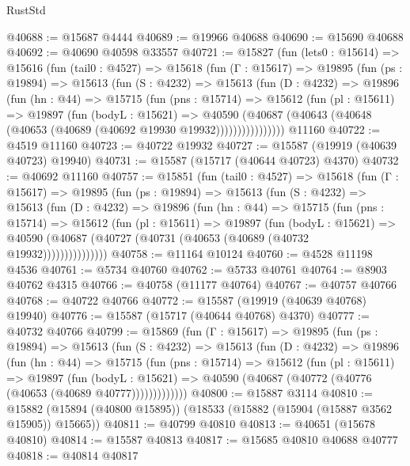 \begin{lexlean}{RustStd}
\begin{coremodule}
@40688 := @15687 @4444
@40689 := @19966 @40688
@40690 := @15690 @40688
@40692 := @40690 @40598 @33557
@40721 := @15827
    (fun (lets0 : @15614) =>
    @15616
      (fun (tail0 : @4527) =>
      @15618
        (fun (Γ : @15617) =>
        @19895
          (fun (ps : @19894) =>
          @15613
            (fun (S : @4232) =>
            @15613
              (fun (D : @4232) =>
              @19896
                (fun (hn : @44) =>
                @15715
                  (fun (pns : @15714) =>
                  @15612
                    (fun (pl : @15611) =>
                    @19897
                      (fun (bodyL : @15621) =>
                      @40590
                        (@40687
                          (@40643 (@40648 (@40653 (@40689 (@40692 @19930 @19932))))))))))))))))
    @11160
@40722 := @4519 @11160
@40723 := @40722 @19932
@40727 := @15587 (@19919 (@40639 @40723) @19940)
@40731 := @15587 (@15717 (@40644 @40723) @4370)
@40732 := @40692 @11160
@40757 := @15851
    (fun (tail0 : @4527) =>
    @15618
      (fun (Γ : @15617) =>
      @19895
        (fun (ps : @19894) =>
        @15613
          (fun (S : @4232) =>
          @15613
            (fun (D : @4232) =>
            @19896
              (fun (hn : @44) =>
              @15715
                (fun (pns : @15714) =>
                @15612
                  (fun (pl : @15611) =>
                  @19897
                    (fun (bodyL : @15621) =>
                    @40590 (@40687 (@40727 (@40731 (@40653 (@40689 (@40732 @19932)))))))))))))))
@40758 := @11164 @10124
@40760 := @4528 @11198 @4536
@40761 := @5734 @40760
@40762 := @5733 @40761
@40764 := @8903 @40762 @4315
@40766 := @40758 (@11177 @40764)
@40767 := @40757 @40766
@40768 := @40722 @40766
@40772 := @15587 (@19919 (@40639 @40768) @19940)
@40776 := @15587 (@15717 (@40644 @40768) @4370)
@40777 := @40732 @40766
@40799 := @15869
    (fun (Γ : @15617) =>
    @19895
      (fun (ps : @19894) =>
      @15613
        (fun (S : @4232) =>
        @15613
          (fun (D : @4232) =>
          @19896
            (fun (hn : @44) =>
            @15715
              (fun (pns : @15714) =>
              @15612
                (fun (pl : @15611) =>
                @19897
                  (fun (bodyL : @15621) =>
                  @40590 (@40687 (@40772 (@40776 (@40653 (@40689 @40777)))))))))))))
@40800 := @15887 @3114
@40810 := @15882 (@15894 (@40800 @15895)) (@18533 (@15882 (@15904 (@15887 @3562 @15905)) @15665))
@40811 := @40799 @40810
@40813 := @40651 (@15678 @40810)
@40814 := @15587 @40813
@40817 := @15685 @40810 @40688 @40777
@40818 := @40814 @40817

\end{coremodule}
\end{lexlean}
